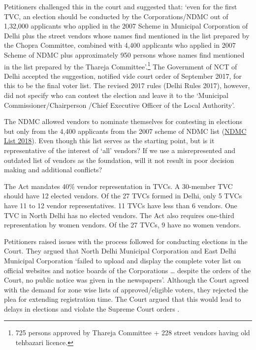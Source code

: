 \documentclass[a4paper, 12pt, twoside, table]{article}
\begin{document}
{{Petitioners challenged this in the court and suggested that: `even for the first TVC, an election should be conducted by the Corporations/NDMC out of 1,32,000 applicants who applied in the 2007 Scheme in Municipal Corporation of Delhi plus the street vendors whose names find mentioned in the list prepared by the Chopra Committee, combined with 4,400 applicants who applied in 2007 Scheme of NDMC plus approximately 950 persons whose names find mentioned in the list prepared by the Thareja Committee'.\footnote{ 725 persons approved by Thareja Committee + 228 street vendors having old tehbazari licence. 
} The Government of NCT of Delhi accepted the suggestion, notified vide court order of September 2017, for this to be the final voter list. The revised 2017 rules (Delhi Rules 2017), however, did not specify who can contest the election and leave it to the `Municipal Commissioner/Chairperson /Chief Executive Officer of the Local Authority'. 

The NDMC allowed vendors to nominate themselves for contesting in elections but only from the 4,400 applicants from the 2007 scheme of NDMC list (\href{https://ndmc.gov.in/public_notice/TVC\%20election\%20process\%20and\%20nomination.pdf}{NDMC List 2018}). Even though this list serves as the starting point, but is it representative of the interest of ‘all’ vendors? If we use a misrepresented and outdated list of vendors as the foundation, will it not result in poor decision making and additional conflicts?


The Act mandates 40\% vendor representation in TVCs. A 30-member TVC should have 12 elected vendors. Of the 27 TVCs formed in Delhi, only 5 TVCs have 11 to 12 vendor representatives. 11 TVCs have less than 6 vendors. One TVC in North Delhi has no elected vendors. The Act also requires one-third representation by women vendors. Of the 27 TVCs, 9 have no women vendors. 

Petitioners raised issues with the process followed for conducting elections in the Court. They argued that North Delhi Municipal Corporation and East Delhi Municipal Corporation `failed to upload and display the complete voter list on official websites and notice boards of the Corporations … despite the orders of the Court, no public notice was given in the newspapers'. Although the Court agreed with the demand for zone wise lists of approved/eligible voters, they rejected the plea for extending registration time. The Court argued that this would lead to delays in elections and violate the Supreme Court orders \parencite{RPKHU}.

}}
\end{document}
